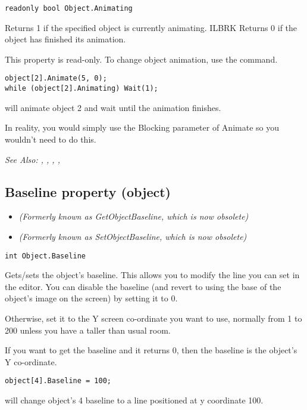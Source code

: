 \begin{verbatim}
readonly bool Object.Animating
\end{verbatim}
Returns 1 if the specified object is currently animating. ILBRK
Returns 0 if the object has finished its animation.

This property is read-only. To change object animation, use the
 command.

\begin{verbatim}
object[2].Animate(5, 0);
while (object[2].Animating) Wait(1);
\end{verbatim}
will animate object 2 and wait until the animation finishes.

In reality, you would simply use the Blocking parameter of Animate so you wouldn't need
to do this.

\it{See Also:} ,
,
,
, 


\subsection{Baseline property (object)}\label{Object.Baseline}%

\begin{itemize}
\item \it{(Formerly known as GetObjectBaseline, which is now obsolete)}
\item \it{(Formerly known as SetObjectBaseline, which is now obsolete)}
\end{itemize}

\begin{verbatim}
int Object.Baseline
\end{verbatim}
Gets/sets the object's baseline. This allows you to modify the line you can
set in the editor. You can disable the baseline (and revert to using the
base of the object's image on the screen) by setting it to 0.

Otherwise, set it to the Y screen co-ordinate you want to use,
normally from 1 to 200 unless you have a taller than usual room.

If you want to get the baseline and it returns 0, then the baseline is the
object's Y co-ordinate.

\begin{verbatim}
object[4].Baseline = 100;
\end{verbatim}
will change object's 4 baseline to a line positioned at y coordinate 100.

